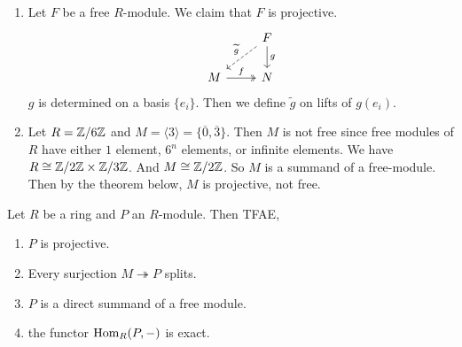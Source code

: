 \documentclass[12pt]{amsart}
\begin{document}
\begin{example}
    \begin{enumerate}
        \item Let $F$ be a free $R$-module. We claim that $F$ is projective. 
        \[\begin{tikzcd}
            {} & F \arrow[d, "g"] \ar[dl, dashed, "\widetilde{g}", swap] \\ 
            M \ar[r, two heads, "f"] & N
        \end{tikzcd}\]
        $g$ is determined on a basis $\{e_i\}$. Then we define $\widetilde{g}$ on lifts of $g(e_i)$. 

        \item Let $R = \mathbb Z/6\mathbb Z$ and $M = \langle 3 \rangle = \{\overline{0}, \overline{3}\}$. Then $M$ is not free since free modules of $R$ have either $1$ element, $6^n$ elements, or infinite elements. We have $R \cong \mathbb Z/2\mathbb Z \times \mathbb Z/3\mathbb Z$. And $M \cong \mathbb Z/2\mathbb Z$. So $M$ is a summand of a free-module. Then by the theorem below, $M$ is projective, not free. 
    \end{enumerate}
\end{example}

\begin{theorem}
    Let $R$ be a ring and $P$ an $R$-module. Then TFAE, 
    \begin{enumerate}
        \item $P$ is projective. 
        \item Every surjection $M \twoheadrightarrow P$ splits. 
        \item $P$ is a direct summand of a free module. 
        \item the functor $\operatorname{Hom}_R(P, -)$ is exact. 
    \end{enumerate}
\end{theorem}
\end{document}
